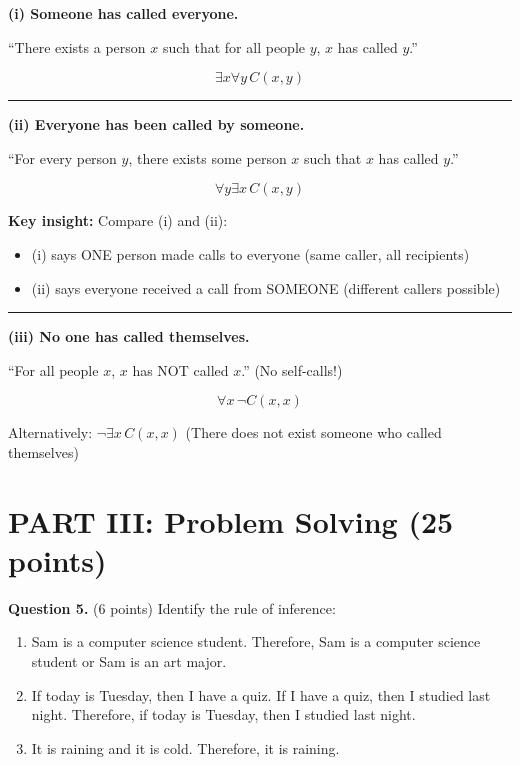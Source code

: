 \documentclass[11pt,a4paper]{article}
\begin{document}
\begin{solnbox}
\textbf{(i) Someone has called everyone.}

``There exists a person $x$ such that for all people $y$, $x$ has called $y$.''

$$\boxed{\exists x \forall y\, C(x, y)}$$

\rule{\linewidth}{0.3pt}

\textbf{(ii) Everyone has been called by someone.}

``For every person $y$, there exists some person $x$ such that $x$ has called $y$.''

$$\boxed{\forall y \exists x\, C(x, y)}$$

\textbf{Key insight:} Compare (i) and (ii):
\begin{itemize}[noitemsep]
    \item (i) says ONE person made calls to everyone (same caller, all recipients)
    \item (ii) says everyone received a call from SOMEONE (different callers possible)
\end{itemize}

\rule{\linewidth}{0.3pt}

\textbf{(iii) No one has called themselves.}

``For all people $x$, $x$ has NOT called $x$.'' (No self-calls!)

$$\boxed{\forall x\, \neg C(x, x)}$$

Alternatively: $\neg \exists x\, C(x, x)$ (There does not exist someone who called themselves)
\end{solnbox}

\newpage

\section*{PART III: Problem Solving (25 points)}

\textbf{Question 5.} (6 points) Identify the rule of inference:

\begin{enumerate}[label=(\roman*)]
    \item Sam is a computer science student. Therefore, Sam is a computer science student or Sam is an art major.
    \item If today is Tuesday, then I have a quiz. If I have a quiz, then I studied last night. Therefore, if today is Tuesday, then I studied last night.
    \item It is raining and it is cold. Therefore, it is raining.
\end{enumerate}
\end{document}
